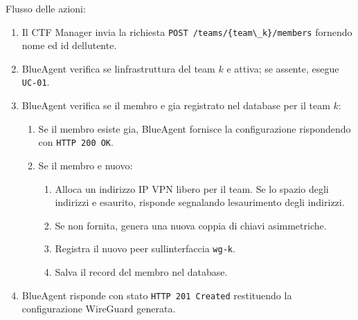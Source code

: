Flusso delle azioni:

\begin{enumerate}
\def\labelenumi{\arabic{enumi}.}
\tightlist
\item
  Il CTF Manager invia la richiesta
  \passthrough{\lstinline!POST /teams/\{team\_k\}/members!} fornendo
  nome ed id dell\textquotesingle utente.
\item
  BlueAgent verifica se l\textquotesingle infrastruttura del team \(k\)
  e\textquotesingle{} attiva; se assente, esegue
  \passthrough{\lstinline!UC-01!}.
\item
  BlueAgent verifica se il membro e\textquotesingle{} gia registrato nel
  database per il team \(k\):

  \begin{enumerate}
  \def\labelenumii{\arabic{enumii}.}
  \tightlist
  \item
    Se il membro esiste gia, BlueAgent fornisce la configurazione
    rispondendo con \passthrough{\lstinline!HTTP 200 OK!}.
  \item
    Se il membro e\textquotesingle{} nuovo:

    \begin{enumerate}
    \def\labelenumiii{\arabic{enumiii}.}
    \tightlist
    \item
      Alloca un indirizzo IP VPN libero per il team. Se lo spazio degli
      indirizzi e\textquotesingle{} esaurito, risponde segnalando
      l\textquotesingle esaurimento degli indirizzi.
    \item
      Se non fornita, genera una nuova coppia di chiavi asimmetriche.
    \item
      Registra il nuovo peer sull\textquotesingle interfaccia
      \passthrough{\lstinline!wg-k!}.
    \item
      Salva il record del membro nel database.
    \end{enumerate}
  \end{enumerate}
\item
  BlueAgent risponde con stato
  \passthrough{\lstinline!HTTP 201 Created!} restituendo la
  configurazione WireGuard generata.
\end{enumerate}
